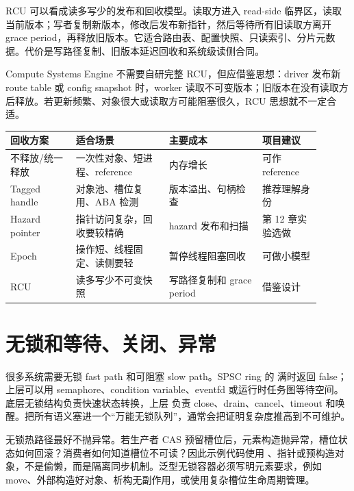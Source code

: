 RCU 可以看成读多写少的发布和回收模型。读取方进入 read-side 临界区，读取当前版本；写者复制新版本，修改后发布新指针，然后等待所有旧读取方离开 grace period，再释放旧版本。它适合路由表、配置快照、只读索引、分片元数据。代价是写路径复制、旧版本延迟回收和系统级读侧合同。

Compute Systems Engine 不需要自研完整 RCU，但应借鉴思想：driver 发布新 route table 或 config snapshot 时，worker 读取不可变版本；旧版本在没有读取方后释放。若更新频繁、对象很大或读取方可能阻塞很久，RCU 思想就不一定合适。

\begin{center}
\begin{tabular}{@{}p{0.19\linewidth}p{0.27\linewidth}p{0.27\linewidth}p{0.17\linewidth}@{}}
\toprule
回收方案 & 适合场景 & 主要成本 & 项目建议 \\
\midrule
不释放/统一释放 & 一次性对象、短进程、reference & 内存增长 & 可作 reference \\
Tagged handle & 对象池、槽位复用、ABA 检测 & 版本溢出、句柄检查 & 推荐理解身份 \\
Hazard pointer & 指针访问复杂，回收要较精确 & hazard 发布和扫描 & 第 12 章实验选做 \\
Epoch & 操作短、线程固定、读侧要轻 & 暂停线程阻塞回收 & 可做小模型 \\
RCU & 读多写少不可变快照 & 写路径复制和 grace period & 借鉴设计 \\
\bottomrule
\end{tabular}
\end{center}

\section{无锁和等待、关闭、异常}

很多系统需要无锁 fast path 和可阻塞 slow path。SPSC ring 的  满时返回 false；上层可以用 semaphore、condition variable、eventfd 或运行时任务图等待空间。底层无锁结构负责快速状态转换，上层  负责 close、drain、cancel、timeout 和唤醒。把所有语义塞进一个“万能无锁队列”，通常会把证明复杂度推高到不可维护。

无锁热路径最好不抛异常。若生产者 CAS 预留槽位后，元素构造抛异常，槽位状态如何回滚？消费者如何知道槽位不可读？因此示例代码使用 、指针或预构造对象，不是偷懒，而是隔离同步机制。泛型无锁容器必须写明元素要求，例如  move、外部构造好对象、析构无副作用，或使用复杂槽位生命周期管理。

